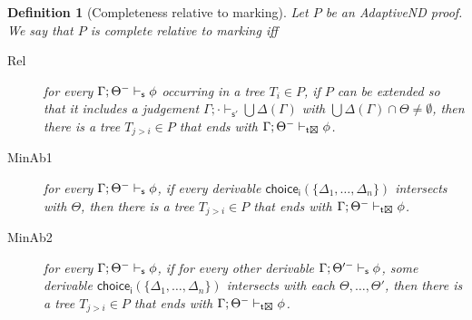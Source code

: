 \documentclass[]{article}
\newtheorem{definition}{Definition}
\begin{document}
\begin{definition}[Completeness relative to marking]
Let $P$ be an {\sf AdaptiveND} proof. We say that $P$ is complete relative to marking
iff
\begin{description}
    \item[Rel] for every $\Gamma; \Theta^{-}\vdash_{{\sf s}} \phi$ occurring in a tree $T_{i}\in P$, if $P$ can be extended so that it includes a judgement $\Gamma;\cdot \vdash_{\mathsf{s'}} \bigcup\Delta(\Gamma)$ with $\bigcup \Delta(\Gamma) \cap \Theta \neq \emptyset$, then there is a tree $T_{j>i}\in P$ that ends with $\Gamma; \Theta^{-}\vdash_{{\sf t\XBox}} \phi$.
    \item[MinAb1] for every $\Gamma; \Theta^{-}\vdash_{{\sf s}} \phi$, if every derivable $\mathsf{choice_i}(\{\Delta_1, \ldots, \Delta_n\})$ intersects with $\Theta$, then there is a tree $T_{j>i}\in P$ that ends with  $\Gamma; \Theta^{-}\vdash_{{\sf t\XBox}} \phi$.
    \item[MinAb2] for every $\Gamma; \Theta^{-}\vdash_{{\sf s}} \phi$, if for every other derivable $\Gamma; \Theta'^{-}\vdash_{{\sf s}} \phi$, some derivable
     $\mathsf{choice_i}(\{\Delta_1, \ldots, \Delta_n\})$ intersects with each $\Theta, \dots, \Theta'$, then there is a tree $T_{j>i}\in P$ that ends with $\Gamma; \Theta^{-}\vdash_{{\sf t\XBox}} \phi$.

\end{description}



\end{definition}

\end{document}
